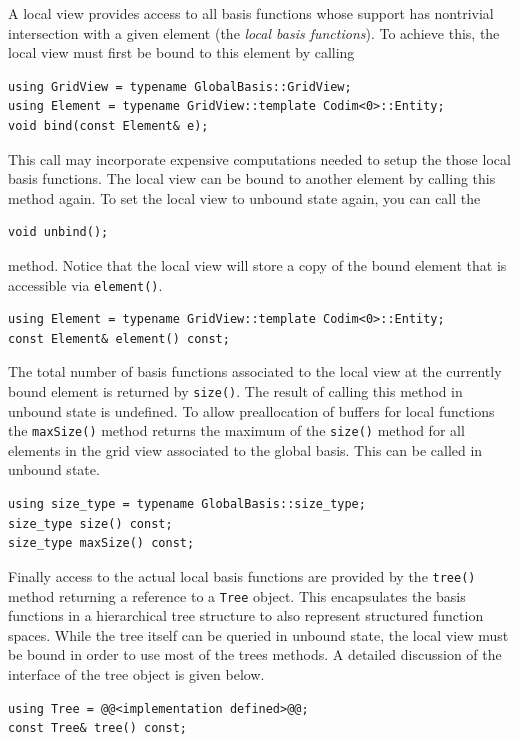 \documentclass[a4paper,10pt,headings=normal,bibliography=totoc]{scrartcl}
\newcommand{\cpp}[1]{\lstinline[basicstyle=\ttfamily]!#1!}
\begin{document}
A local view provides access to all basis
functions whose support has nontrivial intersection with
a given element (the \emph{local basis functions}).
To achieve this, the local view must
first be bound to this element by calling
\begin{lstlisting}[style=Interface]
using GridView = typename GlobalBasis::GridView;
using Element = typename GridView::template Codim<0>::Entity;
void bind(const Element& e);
\end{lstlisting}
This call may incorporate expensive computations needed to
setup the those local basis functions. The local view can be
bound to another element by calling this method again.
To set the local view to unbound state again, you
can call the
\begin{lstlisting}[style=Interface]
void unbind();
\end{lstlisting}
method.
Notice that the local view will store a copy of the bound
element that is accessible via \cpp{element()}.
\begin{lstlisting}[style=Interface]
using Element = typename GridView::template Codim<0>::Entity;
const Element& element() const;
\end{lstlisting}

The total number of basis functions associated to the
local view at the currently bound element is returned
by \cpp{size()}. The result of calling this method in
unbound state is undefined.
To allow preallocation of buffers for local functions
the \cpp{maxSize()} method returns the maximum of the
\cpp{size()} method for all elements in the grid view
associated to the global basis. This can be called in
unbound state.

\begin{lstlisting}[style=Interface]
using size_type = typename GlobalBasis::size_type;
size_type size() const;
size_type maxSize() const;
\end{lstlisting}

Finally access to the actual local basis functions are provided
by the \cpp{tree()} method returning a reference to a
\cpp{Tree} object. This encapsulates the basis functions
in a hierarchical tree structure to also represent structured
function spaces.
While the tree  itself can be queried in unbound state,
the local view must be bound in order to use most of the
trees methods.
A detailed discussion of the interface of the tree object is
given below.

\begin{lstlisting}[style=Interface]
using Tree = @@<implementation defined>@@;
const Tree& tree() const;
\end{lstlisting}
\end{document}
